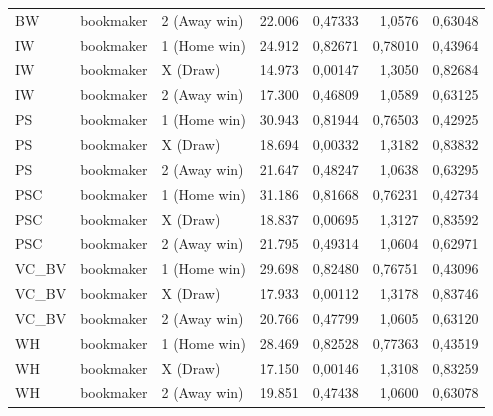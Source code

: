 {\begin{longtable}{@{}lllrrrr@{}}
BW & bookmaker & 2 (Away win) & 22.006 & 0,47333 & 1,0576 & 0,63048 \\
IW & bookmaker & 1 (Home win) & 24.912 & 0,82671 & 0,78010 & 0,43964 \\
IW & bookmaker & X (Draw) & 14.973 & 0,00147 & 1,3050 & 0,82684 \\
IW & bookmaker & 2 (Away win) & 17.300 & 0,46809 & 1,0589 & 0,63125 \\
PS & bookmaker & 1 (Home win) & 30.943 & 0,81944 & 0,76503 & 0,42925 \\
PS & bookmaker & X (Draw) & 18.694 & 0,00332 & 1,3182 & 0,83832 \\
PS & bookmaker & 2 (Away win) & 21.647 & 0,48247 & 1,0638 & 0,63295 \\
PSC & bookmaker & 1 (Home win) & 31.186 & 0,81668 & 0,76231 & 0,42734 \\
PSC & bookmaker & X (Draw) & 18.837 & 0,00695 & 1,3127 & 0,83592 \\
PSC & bookmaker & 2 (Away win) & 21.795 & 0,49314 & 1,0604 & 0,62971 \\
VC\_BV & bookmaker & 1 (Home win) & 29.698 & 0,82480 & 0,76751 & 0,43096 \\
VC\_BV & bookmaker & X (Draw) & 17.933 & 0,00112 & 1,3178 & 0,83746 \\
VC\_BV & bookmaker & 2 (Away win) & 20.766 & 0,47799 & 1,0605 & 0,63120 \\
WH & bookmaker & 1 (Home win) & 28.469 & 0,82528 & 0,77363 & 0,43519 \\
WH & bookmaker & X (Draw) & 17.150 & 0,00146 & 1,3108 & 0,83259 \\
WH & bookmaker & 2 (Away win) & 19.851 & 0,47438 & 1,0600 & 0,63078 \\
\end{longtable}
}

